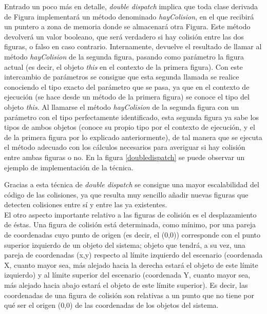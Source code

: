 Entrado un poco más en detalle, \emph{double dispatch} implica que toda clase derivada de Figura implementará un método denominado \emph{hayColision}, en el que recibirá un puntero a zona de memoria donde se almacenará otra Figura. Este método devolverá un valor booleano, que será verdadero si hay colisión entre las dos figuras, o falso en caso contrario. Internamente, devuelve el resultado de llamar al método \emph{hayColision} de la segunda figura, pasando como parámetro la figura actual (es decir, el objeto \emph{this} en el contexto de la primera figura). Con este intercambio de parámetros se consigue que esta segunda llamada se realice conociendo el tipo exacto del parámetro que se pasa, ya que en el contexto de ejecución (se hace desde un método de la primera figura) se conoce el tipo del objeto \emph{this}. Al llamarse el método \emph{hayColision} de la segunda figura con un parámetro con el tipo perfectamente identificado, esta segunda figura ya sabe los tipos de ambos objetos (conoce su propio tipo por el contexto de ejecución, y el de la primera figura por lo explicado anteriormente), de tal manera que se ejecuta el método adecuado con los cálculos necesarios para averiguar si hay colisión entre ambas figuras o no. En la figura \ref{doubledispatch} se puede observar un ejemplo de implementación de la técnica.\\


Gracias a esta técnica de \emph{double dispatch} se consigue una mayor escalabilidad del código de las colisiones, ya que resulta muy sencillo añadir nuevas figuras que detecten colisiones entre sí y entre las ya existentes.\\

El otro aspecto importante relativo a las figuras de colisión es el desplazamiento de éstas. Una figura de colisión está determinada, como mínimo, por una pareja de coordenadas cuyo punto de origen (es decir, el (0,0)) corresponde con el punto superior izquierdo de un objeto del sistema; objeto que tendrá, a su vez, una pareja de coordenadas (x,y) respecto al límite izquierdo del escenario (coordenada X, cuanto mayor sea, más alejado hacia la derecha estará el objeto de este límite izquierdo) y al límite superior del escenario (coordenada Y, cuanto mayor sea, más alejado hacia abajo estará el objeto de este límite superior). Es decir, las coordenadas de una figura de colisión son relativas a un punto que no tiene por qué ser el origen (0,0) de las coordenadas de los objetos del sistema.\\

